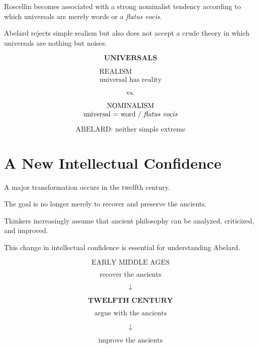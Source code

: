 \documentclass[11pt]{article}
\newcommand{\latin}[1]{\textit{#1}}
\begin{document}
Roscellin becomes associated with a strong nominalist tendency
according to which universals are merely words or a
\latin{flatus vocis}.

Abelard rejects simple realism but also does not accept a crude
theory in which universals are nothing but noises.

\begin{whiteboard}
\[
\textbf{UNIVERSALS}
\]

\[
\begin{array}{c}
\text{REALISM}\\
\text{universal has reality}
\end{array}
\]

\[
\text{vs.}
\]

\[
\begin{array}{c}
\text{NOMINALISM}\\
\text{universal = word / \latin{flatus vocis}}
\end{array}
\]

\[
\boxed{\text{ABELARD: neither simple extreme}}
\]
\end{whiteboard}

\section{A New Intellectual Confidence}

A major transformation occurs in the twelfth century.

The goal is no longer merely to recover and preserve the ancients.

Thinkers increasingly assume that ancient philosophy can be
analyzed, criticized, and improved.

This change in intellectual confidence is essential for
understanding Abelard.

\begin{whiteboard}
\[
\text{EARLY MIDDLE AGES}
\]

\[
\text{recover the ancients}
\]

\[
\downarrow
\]

\[
\textbf{TWELFTH CENTURY}
\]

\[
\text{argue with the ancients}
\]

\[
\downarrow
\]

\[
\boxed{\text{improve the ancients}}
\]
\end{whiteboard}
\end{document}

